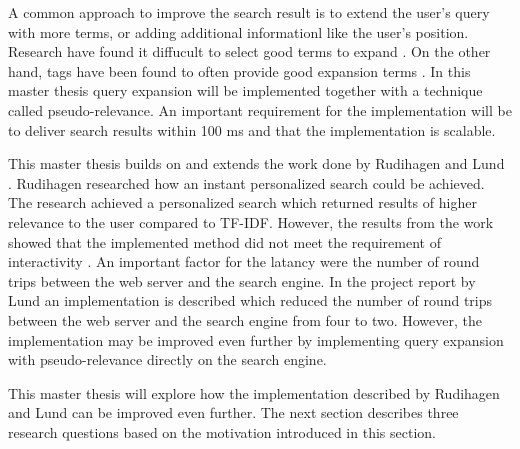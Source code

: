 A common approach to improve the search result is to extend the user's query with more terms,
or adding additional informationl like the user's position.
Research have found it diffucult to select good terms to expand \cite{pseudo-relevance-invalid}.
On the other hand, tags have been found to often provide good expansion terms \cite{ir-hashtag}.
In this master thesis query expansion will be implemented together with a technique called pseudo-relevance.
An important requirement for the implementation will be to deliver search results within 100 ms and that the implementation is scalable.

This master thesis builds on and extends the work done by Rudihagen \cite{master-thesis} and Lund \cite{project-report}.
Rudihagen researched how an instant personalized search could be achieved.
The research achieved a personalized search which returned results of higher relevance to the user compared to TF-IDF.
However, the results from the work showed that the implemented method did not meet the requirement of interactivity \cite{master-thesis}.
An important factor for the latancy were the number of round trips between the web server and the search engine.
In the project report by Lund \cite{project-report} an implementation is described which reduced the number of round trips between the web server and the search engine from four to two.
However, the implementation may be improved even further by implementing query expansion with pseudo-relevance directly on the search engine.

This master thesis will explore how the implementation described by Rudihagen and Lund can be improved even further.
The next section describes three research questions based on the motivation introduced in this section.
